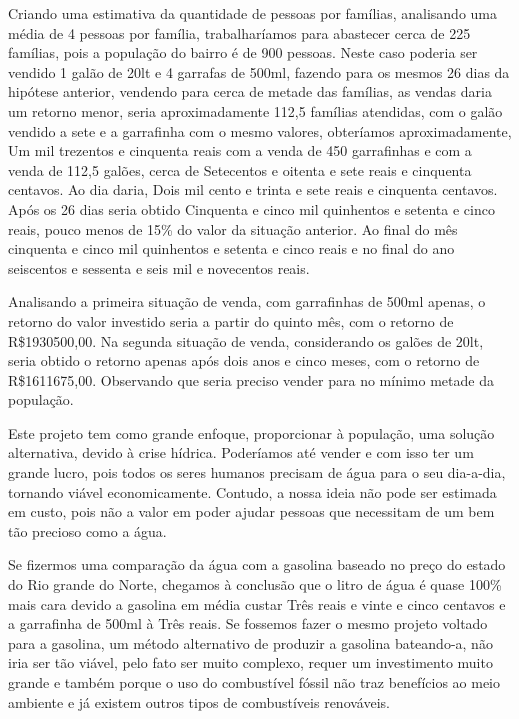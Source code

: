       
      Criando uma estimativa da quantidade de pessoas por famílias, analisando uma média de 4 pessoas por família, trabalharíamos
      para abastecer cerca de 225 famílias, pois a população do bairro é de 900 pessoas. Neste caso poderia ser vendido 1 galão 
      de 20lt e 4 garrafas de 500ml, fazendo para os mesmos 26 dias da hipótese anterior, vendendo para cerca de metade das
      famílias, as vendas daria um retorno menor, seria aproximadamente 112,5 famílias atendidas, com o galão vendido a sete 
      e a garrafinha com o mesmo valores, obteríamos aproximadamente, Um mil trezentos e cinquenta reais com a venda de 450
      garrafinhas e com a venda de 112,5 galões, cerca de Setecentos e oitenta e sete reais e cinquenta centavos. Ao dia daria,
      Dois mil cento e trinta e sete reais e cinquenta centavos. Após os 26 dias seria obtido Cinquenta e cinco mil quinhentos
      e setenta e cinco reais, pouco menos de 15\% do valor da situação anterior. Ao final do mês cinquenta e cinco mil 
      quinhentos e setenta e cinco reais e no final do ano seiscentos e sessenta e seis mil e novecentos reais.
      
      
      Analisando a primeira situação de venda, com garrafinhas de 500ml apenas, o retorno do valor investido seria a partir do quinto mês, com o retorno de R\$1930500,00. Na segunda situação de venda, considerando os galões de 20lt, seria obtido o retorno apenas após dois anos e cinco meses, com o retorno de R\$1611675,00. Observando que seria preciso vender para no mínimo metade da população.
      
      Este projeto tem como grande enfoque, proporcionar à população, uma solução alternativa, devido à crise hídrica. Poderíamos até vender e com isso ter um grande lucro, pois todos os seres humanos precisam de água para o seu dia-a-dia, tornando viável economicamente. Contudo, a nossa ideia não pode ser estimada em custo, pois não a valor em poder ajudar pessoas que necessitam de um bem tão precioso como a água.
      
      Se fizermos uma comparação da água com a gasolina baseado no preço do estado do Rio grande do Norte, chegamos à conclusão que o litro de água é quase 100\% mais cara devido a gasolina em média custar Três reais e vinte e cinco centavos e a garrafinha de 500ml à Três reais. Se fossemos fazer o mesmo projeto voltado para a gasolina, um método alternativo de produzir a gasolina bateando-a, não iria ser tão viável, pelo fato ser muito complexo, requer um investimento muito grande e também porque o uso do combustível fóssil não traz benefícios ao meio ambiente e já existem outros tipos de combustíveis renováveis.  
      
